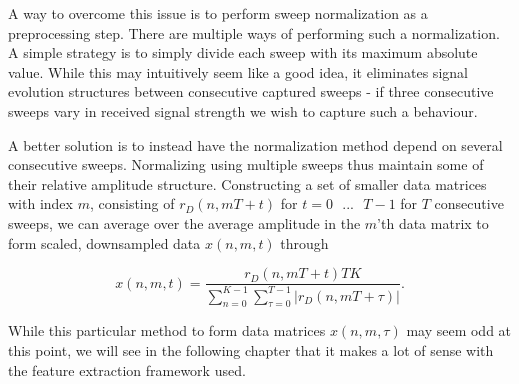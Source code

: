 A way to overcome this issue is to perform sweep normalization as a preprocessing step. There are multiple ways of performing such a normalization. A simple strategy is to simply divide each sweep with its maximum absolute value. While this may intuitively seem like a good idea, it eliminates signal evolution structures between consecutive captured sweeps - if three consecutive sweeps vary in received signal strength we wish to capture such a behaviour. 

A better solution is to instead have the normalization method depend on several consecutive sweeps. Normalizing using multiple sweeps thus maintain some of their relative amplitude structure. Constructing a set of smaller data matrices with index $m$, consisting of $r_D(n,mT + t)$ for $t=0\text{ }...\text{ }T-1$ for $T$ consecutive sweeps, we can average over the average amplitude in the $m$'th data matrix to form scaled, downsampled data $x(n,m,t)$ through

\begin{equation}
	x(n,m,t) = 
	\frac{r_{D}(n,mT + t)TK}
	{\sum_{n=0}^{K-1}\sum_{\tau=0}^{T-1}|r_{D}(n,mT + \tau)|}.
\end{equation}

While this particular method to form data matrices $x(n,m,\tau)$ may seem odd at this point, we will see in the following chapter that it makes a lot of sense with the feature extraction framework used.
